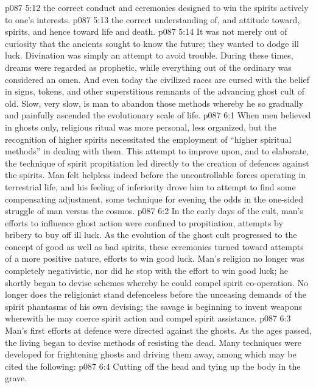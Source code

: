 \vs p087 5:12 \bibnobreakspace {} the correct conduct and ceremonies designed to win the spirits actively to one’s interests.
\vs p087 5:13 \bibnobreakspace {} the correct understanding of, and attitude toward, spirits, and hence toward life and death.
\vs p087 5:14 \pc It was not merely out of curiosity that the ancients sought to know the future; they wanted to dodge ill luck. Divination was simply an attempt to avoid trouble. During these times, dreams were regarded as prophetic, while everything out of the ordinary was considered an omen. And even today the civilized races are cursed with the belief in signs, tokens, and other superstitious remnants of the advancing ghost cult of old. Slow, very slow, is man to abandon those methods whereby he so gradually and painfully ascended the evolutionary scale of life.
\vs p087 6:1 When men believed in ghosts only, religious ritual was more personal, less organized, but the recognition of higher spirits necessitated the employment of “higher spiritual methods” in dealing with them. This attempt to improve upon, and to elaborate, the technique of spirit propitiation led directly to the creation of defences against the spirits. Man felt helpless indeed before the uncontrollable forces operating in terrestrial life, and his feeling of inferiority drove him to attempt to find some compensating adjustment, some technique for evening the odds in the one\hyp{}sided struggle of man versus the cosmos.
\vs p087 6:2 In the early days of the cult, man’s efforts to influence ghost action were confined to propitiation, attempts by bribery to buy off ill luck. As the evolution of the ghost cult progressed to the concept of good as well as bad spirits, these ceremonies turned toward attempts of a more positive nature, efforts to win good luck. Man’s religion no longer was completely negativistic, nor did he stop with the effort to win good luck; he shortly began to devise schemes whereby he could compel spirit co\hyp{}operation. No longer does the religionist stand defenceless before the unceasing demands of the spirit phantasms of his own devising; the savage is beginning to invent weapons wherewith he may coerce spirit action and compel spirit assistance.
\vs p087 6:3 Man’s first efforts at defence were directed against the ghosts. As the ages passed, the living began to devise methods of resisting the dead. Many techniques were developed for frightening ghosts and driving them away, among which may be cited the following:
\vs p087 6:4 \bibnobreakspace Cutting off the head and tying up the body in the grave.
